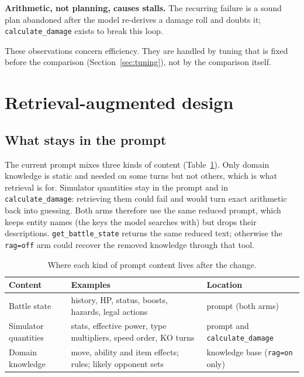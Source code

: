 \documentclass[11pt,a4paper]{article}
\newcommand{\code}[1]{\texttt{#1}}
\begin{document}
\textbf{Arithmetic, not planning, causes stalls.} The recurring failure is a sound plan abandoned after the
model re-derives a damage roll and doubts it; \code{calculate\_damage} exists to break this loop.

These observations concern efficiency. They are handled by tuning that is fixed before the comparison
(Section~\ref{sec:tuning}), not by the comparison itself.

\section{Retrieval-augmented design}
\label{sec:rag}

\subsection{What stays in the prompt}
The current prompt mixes three kinds of content (Table~\ref{tab:split}). Only domain knowledge is static and
needed on some turns but not others, which is what retrieval is for. Simulator quantities stay in the prompt
and in \code{calculate\_damage}: retrieving them could fail and would turn exact arithmetic back into guessing.
Both arms therefore use the same reduced prompt, which keeps entity names (the keys the model searches with)
but drops their descriptions. \code{get\_battle\_state} returns the same reduced text; otherwise the
\code{rag=off} arm could recover the removed knowledge through that tool.

\begin{table}[t]
\centering
\small
\caption{Where each kind of prompt content lives after the change.}
\label{tab:split}
\begin{tabularx}{\textwidth}{@{}>{\raggedright\arraybackslash}p{3.0cm} >{\raggedright\arraybackslash}X >{\raggedright\arraybackslash}p{3.6cm}@{}}
\toprule
\textbf{Content} & \textbf{Examples} & \textbf{Location} \\
\midrule
Battle state          & history, HP, status, boosts, hazards, legal actions & prompt (both arms) \\
Simulator quantities  & stats, effective power, type multipliers, speed order, KO turns & prompt and \code{calculate\_damage} \\
\textcolor{ragblue}{Domain knowledge} & move, ability and item effects; rules; likely opponent sets
                      & \textcolor{ragblue}{knowledge base} (\code{rag=on} only) \\
\bottomrule
\end{tabularx}
\end{table}
\end{document}
